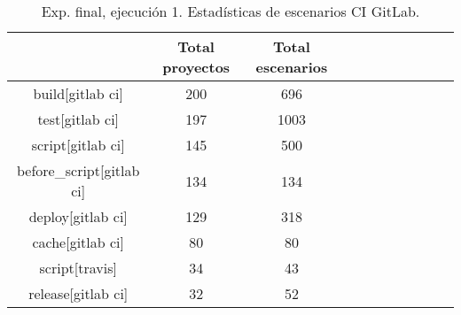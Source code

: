 \begin{table}
  \centering
  \caption{Exp. final, ejecución 1. Estadísticas de escenarios CI GitLab.}
  \label{tab:tabla_f1_9}

\begin{footnotesize}
\renewcommand{\arraystretch}{1.5} %
\begin{tabular}{ccccccccccc}
  \hline
  {} &  Total proyectos &  Total escenarios \\
  \hline
  build[gitlab ci]                           &                 200 &           696 \\
  test[gitlab ci]                            &                 197 &          1003 \\
  script[gitlab ci]                          &                 145 &           500 \\
  before\_script[gitlab ci]                   &                 134 &           134 \\
  deploy[gitlab ci]                          &                 129 &           318 \\
  cache[gitlab ci]                           &                  80 &            80 \\
  script[travis]                             &                  34 &            43 \\
  release[gitlab ci]                         &                  32 &            52 \\
 \end{tabular}
\end{footnotesize}

\end{table}

\newpage


